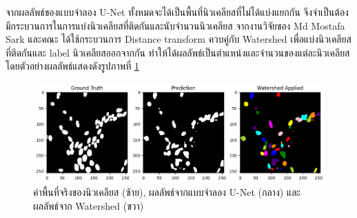 \documentclass[12pt,oneside,openright,a4paper]{cpe-thai-project}
\begin{document}
\begin{itemize}[listparindent=\parindent]
จากผลลัพธ์ของแบบจำลอง U-Net ทั้งหมดจะได้เป็นพื้นที่นิวเคลียสที่ไม่ได้แบ่งแยกกัน จึงจำเป็นต้องมีกระบวนการในการแบ่งนิวเคลียสที่ติดกันและนับจำนวนนิวเคลียส จากงานวิจัยของ Md Mostafa Sark และคณะ \cite{30}  ได้ใช้กระบวนการ Distance transform ควบคู่กับ Watershed เพื่อแบ่งนิวเคลียสที่ติดกันและ label นิวเคลียสออกจากกัน ทำให้ได้ผลลัพธ์เป็นตำแหน่งและจำนวนของแต่ละนิวเคลียส โดยตัวอย่างผลลัพธ์แสดงดังรูปภาพที่ \ref{fig:unet-pred}
\begin{figure}[!h]
    \centering
    \includegraphics[scale=0.5]{images/unet_pred.png}
    \captionsetup{justification=centering}
    \caption{ค่าพื้นที่จริงของนิวเคลียส (ซ้าย), ผลลัพธ์จากแบบจำลอง U-Net (กลาง) และ ผลลัพธ์จาก Watershed (ขวา)}
    \label{fig:unet-pred}
\end{figure}

\end{itemize}
\pagebreak
\end{document}
